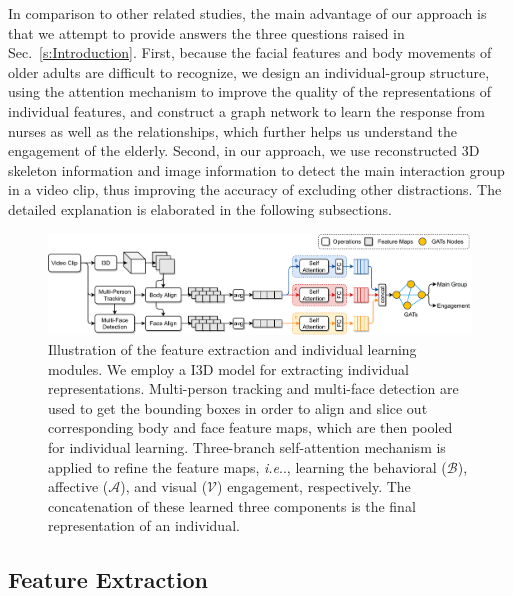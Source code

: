 \documentclass[10pt,journal,compsoc]{IEEEtran}
\makeatletter
\DeclareRobustCommand\onedot{\futurelet\@let@token\@onedot}
\def\@onedot{\ifx\@let@token.\else.\null\fi\xspace}
\def\ie{\emph{i.e}\onedot} \def\Ie{\emph{I.e}\onedot}
\makeatother
\begin{document}
In comparison to other related studies, the main advantage of our approach is that we attempt to provide answers the three questions raised in Sec.~\ref{s:Introduction}. First, because the facial features and body movements of older adults are difficult to recognize, we design an individual-group structure, using the attention mechanism to improve the quality of the representations of individual features, and construct a graph network to learn the response from nurses as well as the relationships, which further helps us understand the engagement of the elderly. Second, in our approach, we use reconstructed 3D skeleton information and image information to detect the main interaction group in a video clip, thus improving the accuracy of excluding other distractions. The detailed explanation is elaborated in the following subsections.

\begin{figure}[t]
  \centering
  \includegraphics[width=\linewidth]{assets/pipeline_3.drawio}
  \caption{Illustration of the feature extraction and individual learning modules. We employ a I3D model for extracting individual representations. Multi-person tracking and multi-face detection are used to get the bounding boxes in order to align and slice out corresponding body and face feature maps, which are then pooled for individual learning. Three-branch self-attention mechanism is applied to refine the feature maps, \ie, learning the behavioral ($\mathcal{B}$), affective ($\mathcal{A}$), and visual ($\mathcal{V}$) engagement, respectively. The concatenation of these learned three components is the final representation of an individual.}
  \label{f:pipeline_3}
\end{figure}

\subsection{Feature Extraction}
\label{subs:Feature_Extraction}
\end{document}
